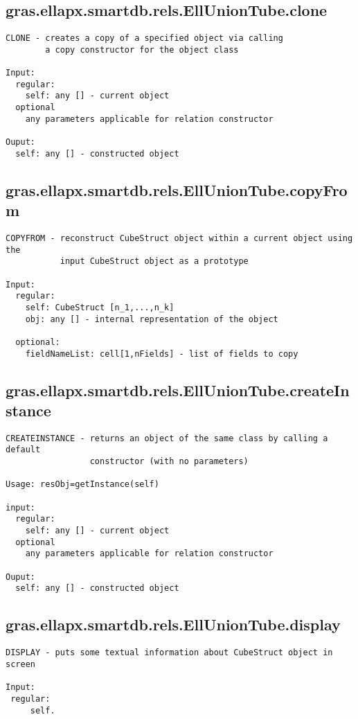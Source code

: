 \subsection{\texorpdfstring{gras.ellapx.smartdb.rels.EllUnionTube.clone}{clone}}\label{method:gras.ellapx.smartdb.rels.EllUnionTube.clone}
\begin{verbatim}
CLONE - creates a copy of a specified object via calling
        a copy constructor for the object class

Input:
  regular:
    self: any [] - current object
  optional
    any parameters applicable for relation constructor

Ouput:
  self: any [] - constructed object
\end{verbatim}
\subsection{\texorpdfstring{gras.ellapx.smartdb.rels.EllUnionTube.copyFrom}{copyFrom}}\label{method:gras.ellapx.smartdb.rels.EllUnionTube.copyFrom}
\begin{verbatim}
COPYFROM - reconstruct CubeStruct object within a current object using the
           input CubeStruct object as a prototype

Input:
  regular:
    self: CubeStruct [n_1,...,n_k]
    obj: any [] - internal representation of the object

  optional:
    fieldNameList: cell[1,nFields] - list of fields to copy
\end{verbatim}
\subsection{\texorpdfstring{gras.ellapx.smartdb.rels.EllUnionTube.createInstance}{createInstance}}\label{method:gras.ellapx.smartdb.rels.EllUnionTube.createInstance}
\begin{verbatim}
CREATEINSTANCE - returns an object of the same class by calling a default
                 constructor (with no parameters)

Usage: resObj=getInstance(self)

input:
  regular:
    self: any [] - current object
  optional
    any parameters applicable for relation constructor

Ouput:
  self: any [] - constructed object
\end{verbatim}
\subsection{\texorpdfstring{gras.ellapx.smartdb.rels.EllUnionTube.display}{display}}\label{method:gras.ellapx.smartdb.rels.EllUnionTube.display}
\begin{verbatim}
DISPLAY - puts some textual information about CubeStruct object in screen

Input:
 regular:
     self.
\end{verbatim}
